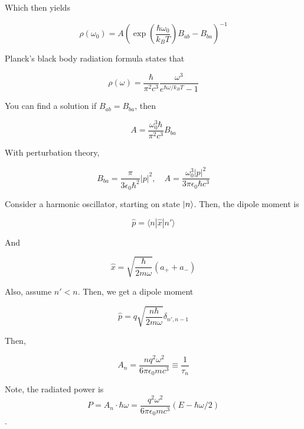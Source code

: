 \documentclass{article}
\newtheorem{one minute paper}[theorem]{One Minute Paper}
\begin{document}
Which then yields 

\begin{equation}
    \rho(\omega_0) = A\left( \exp\left( \frac{\hbar \omega_0}{k_B T}\right)B_{ab} - B_{ba} \right)^{-1}
\end{equation}

Planck's black body radiation formula states that 

\begin{equation}
    \rho(\omega) = \frac{\hbar}{\pi^2c^3}\frac{\omega^3}{e^{\hbar \omega/k_B T} - 1}
\end{equation}

You can find a solution if $B_{ab} = B_{ba}$, then 

\begin{equation}
    A = \frac{\omega_0^3\hbar}{\pi^2 c^3}B_{ba}
\end{equation}

With perturbation theory, 

\begin{equation}
    B_{ba} = \frac{\pi}{3\epsilon_0 \hbar^2}|p|^2, \quad A = \frac{\omega_0^3 |p|^2}{3\pi \epsilon_0 \hbar c^3}
\end{equation}

Consider a harmonic oscillator, starting on state $\ket{n}$. Then, the dipole moment is

\begin{equation}
    \hat{p} = \langle n | \hat{x} | n' \rangle
\end{equation}

And 

\begin{equation}
    \hat{x} = \sqrt{\frac{\hbar}{2m \omega}}\left( a_{+} + a_{-} \right)
\end{equation}

Also, assume $n' < n$. Then, we get a dipole moment 

\begin{equation}
    \hat{p} = q\sqrt{\frac{n\hbar}{2m \omega}}\delta_{n',n-1}
\end{equation}

Then, 

\begin{equation}
    A_n = \frac{nq^2 \omega^2}{6\pi \epsilon_0 mc^3} \equiv \frac{1}{\tau_n}
\end{equation}

Note, the radiated power is $$P = A_n \cdot \hbar \omega = \frac{q^2\omega^2}{6\pi \epsilon_0 mc^3}(E - \hbar \omega/2)$$. 
\end{document}
